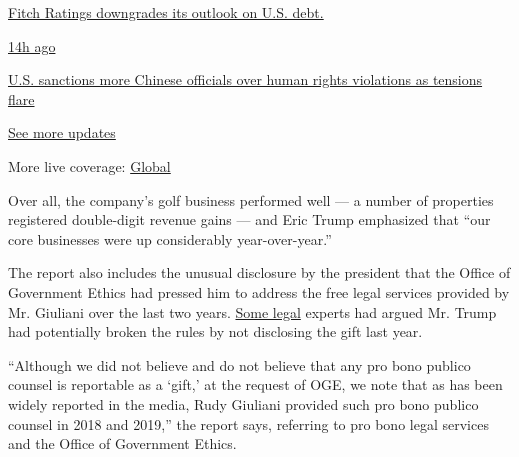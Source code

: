 \href{https://www.nytimes3xbfgragh.onion/live/2020/07/31/business/stock-market-today-coronavirus?action=click\&pgtype=Article\&state=default\&region=MAIN_CONTENT_1\&context=storylines_live_updates\#fitch-ratings-downgrades-its-outlook-on-us-debt}{Fitch
Ratings downgrades its outlook on U.S. debt.}

\href{https://www.nytimes3xbfgragh.onion/live/2020/07/31/business/stock-market-today-coronavirus?action=click\&pgtype=Article\&state=default\&region=MAIN_CONTENT_1\&context=storylines_live_updates\#us-sanctions-more-chinese-officials-over-human-rights-violations-as-tensions-flare}{14h
ago}

\href{https://www.nytimes3xbfgragh.onion/live/2020/07/31/business/stock-market-today-coronavirus?action=click\&pgtype=Article\&state=default\&region=MAIN_CONTENT_1\&context=storylines_live_updates\#us-sanctions-more-chinese-officials-over-human-rights-violations-as-tensions-flare}{U.S.
sanctions more Chinese officials over human rights violations as
tensions flare}

\href{https://www.nytimes3xbfgragh.onion/live/2020/07/31/business/stock-market-today-coronavirus?action=click\&pgtype=Article\&state=default\&region=MAIN_CONTENT_1\&context=storylines_live_updates}{See
more updates}

More live coverage:
\href{https://www.nytimes3xbfgragh.onion/2020/07/31/world/coronavirus-covid-19.html?action=click\&pgtype=Article\&state=default\&region=MAIN_CONTENT_1\&context=storylines_live_updates}{Global}

Over all, the company's golf business performed well --- a number of
properties registered double-digit revenue gains --- and Eric Trump
emphasized that ``our core businesses were up considerably
year-over-year.''

The report also includes the unusual disclosure by the president that
the Office of Government Ethics had pressed him to address the free
legal services provided by Mr. Giuliani over the last two years.
\href{https://www.nytimes3xbfgragh.onion/2019/12/13/us/politics/giuliani-trump-financial-disclosure.html}{Some
legal} experts had argued Mr. Trump had potentially broken the rules by
not disclosing the gift last year.

``Although we did not believe and do not believe that any pro bono
publico counsel is reportable as a `gift,' at the request of OGE, we
note that as has been widely reported in the media, Rudy Giuliani
provided such pro bono publico counsel in 2018 and 2019,'' the report
says, referring to pro bono legal services and the Office of Government
Ethics.

